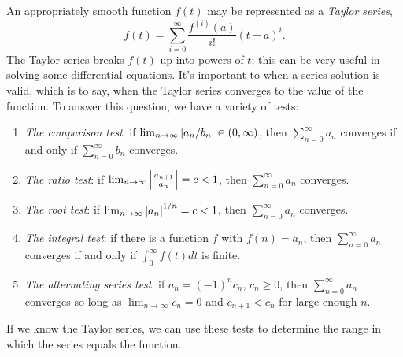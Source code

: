 \documentclass[10pt,driverfallback=hypertex]{report}
\begin{document}
An appropriately smooth function $f(t)$ may be represented as a 
\emph{Taylor series},
\begin{dmath*}
  \boxed{f(t)=\sum_{i=0}^\infty \frac{f^{(i)}(a)}{i!}(t-a)^i}.
\end{dmath*}
The Taylor series breaks $f(t)$ up into powers of $t$; this can be
very useful in solving some differential equations.  It's important to when
a series solution is valid, which is to say, when the Taylor series
converges to the value of the function. To answer this question, we have
a variety of tests:
\begin{enumerate}
\item \emph{The comparison test}: if $\lim_{n \rightarrow \infty}
  \abs{a_n/b_n} \in (0,\infty)$, then $\sum_{n=0}^\infty a_n$
  converges if and only if $\sum_{n=0}^\infty b_n$ converges.
\item \emph{The ratio test}: if
  $\lim_{n\rightarrow\infty}\abs{\frac{a_{n+1}}{a_n}}=c < 1$, then
  $\sum_{n=0}^\infty a_n$ converges.
\item \emph{The root test}: if $\lim_{n\rightarrow\infty}\abs{a_n}^{1/n}=c < 1$,
  then $\sum_{n=0}^\infty a_n$ converges.
\item \emph{The integral test}: if there is a function $f$ with
  $f(n)=a_n$, then $\sum_{n=0}^\infty a_n$ converges if and only if
  $\int_0^\infty f(t) dt$ is finite.
\item \emph{The alternating series test}: if $a_n = (-1)^n c_n$, $c_n \geq
  0$, then $\sum_{n=0}^\infty a_n$ converges so long as
  $\lim_{n\rightarrow\infty}c_n=0$ and $c_{n+1} < c_n$ for large
  enough $n$.
\end{enumerate}
If we know the Taylor series, we can use these tests to determine the range
in which the series equals the function.

\end{document}
